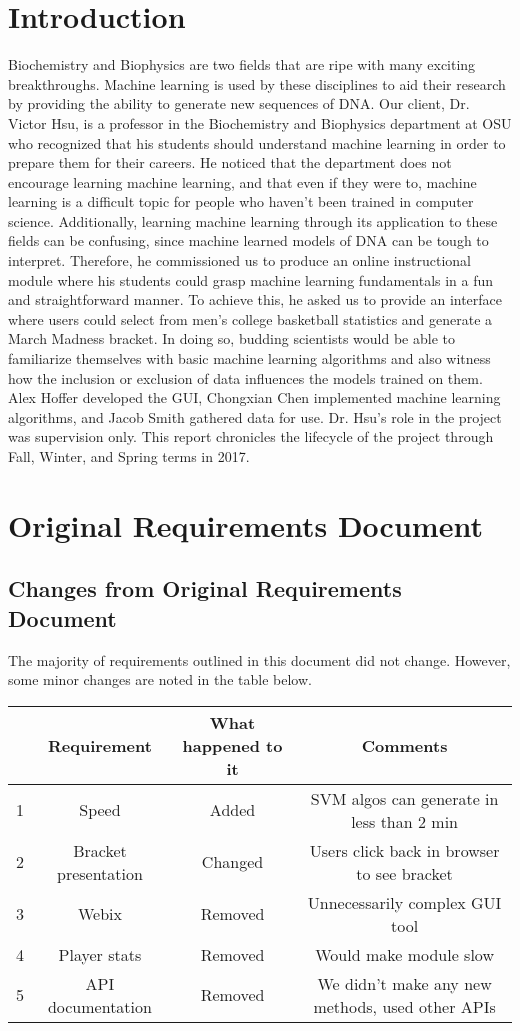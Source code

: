 \documentclass[onecolumn, draftclsnofoot,10pt, compsoc]{IEEEtran}
\begin{document}
\section{Introduction}
Biochemistry and Biophysics are two fields that are ripe with many exciting breakthroughs. Machine learning is used by these disciplines to aid their research by providing the ability to generate new sequences of DNA. Our client, Dr. Victor Hsu, is a professor in the Biochemistry and Biophysics department at OSU who recognized that his students should understand machine learning in order to prepare them for their careers. He noticed that the department does not encourage learning machine learning, and that even if they were to, machine learning is a difficult topic for people who haven't been trained in computer science. Additionally, learning machine learning through its application to these fields can be confusing, since machine learned models of DNA can be tough to interpret. Therefore, he commissioned us to produce an online instructional module where his students could grasp machine learning fundamentals in a fun and straightforward manner. To achieve this, he asked us to provide an interface where users could select from men's college basketball statistics and generate a March Madness bracket. In doing so, budding scientists would be able to familiarize themselves with basic machine learning algorithms and also witness how the inclusion or exclusion of data influences the models trained on them. Alex Hoffer developed the GUI, Chongxian Chen implemented machine learning algorithms, and Jacob Smith gathered data for  use. Dr. Hsu's role in the project was supervision only. This report chronicles the lifecycle of the project through Fall, Winter, and Spring terms in 2017.

\section{Original Requirements Document}

\newpage
\subsection{Changes from Original Requirements Document}
The majority of requirements outlined in this document did not change. However, some minor changes are noted in the table below.
\begin{center}
	\begin{tabular}{ || c || c || c  || c ||}
	\hline
 	  & Requirement & What happened to it & Comments \\ \hline
	1 & Speed & Added & SVM algos can generate in less than 2 min \\ \hline
	2 & Bracket presentation & Changed & Users click back in browser to see bracket \\ \hline
	3 & Webix & Removed & Unnecessarily complex GUI tool \\ \hline
	4 & Player stats & Removed & Would make module slow \\ \hline
	5 & API documentation & Removed & We didn't make any new methods, used other APIs \\ 
	\hline
	\end{tabular}
\end{center}
\end{document}
